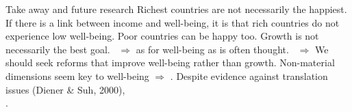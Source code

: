 \documentclass[aspectratio=169,xcolor=dvipsnames, 11pt,mathserif]{beamer}
\begin{document}
\begin{frame}{Take away and future research}
    \bbvsp
    \ip {}
    \ip Richest countries are not necessarily the happiest.
    \ip If there is a link between income and well-being, it is that rich countries do not experience low well-being.
    \ip Poor countries can be happy too. Growth is not necessarily the best goal.
    \ip ~$\Rightarrow$  as  for well-being as is often thought.
    \ip ~$\Rightarrow$ We should seek reforms that improve well-being rather than growth. %
    \ip Non-material dimensions seem key to well-being $\Rightarrow$ . %
    \ip Despite evidence against translation issues (Diener \& Suh, 2000), %
    \\.
    \ee
\end{frame}
\end{document}
